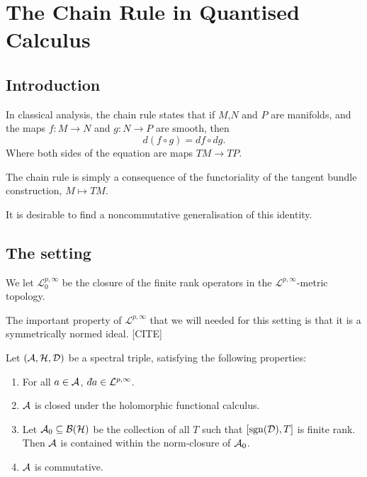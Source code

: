 
\chapter{The Chain Rule in Quantised Calculus} %

\label{TheChainRule} %



\section{Introduction}
In classical analysis, the chain rule states that if $M$,$N$ and $P$ are manifolds, 
 and the maps $f:M\rightarrow N$ and $g:N\rightarrow P$ are smooth, then
\begin{equation*}
    d(f\circ g) = df \circ dg.
\end{equation*}
Where both sides of the equation are maps $TM\rightarrow TP$.

\begin{remark}
    The chain rule is simply a consequence of the functoriality of the tangent
    bundle construction, $M\mapsto TM$.
\end{remark}

 It is desirable
to find a noncommutative generalisation of this identity.


\section{The setting}
We let $\mathcal{L}^{p,\infty}_0$ be the closure of the finite rank
operators in the $\mathcal{L}^{p,\infty}$-metric topology.

The important property of $\mathcal{L}^{p,\infty}$ that we will needed
for this setting is that it is a symmetrically normed ideal. [CITE]

Let $(\mathcal{A},\mathcal{H},\mathcal{D})$ be a spectral triple, satisfying the following properties:
\begin{enumerate}
    \item{} For all $a \in \mathcal{A}$, $\qd a \in \mathcal{L}^{p,\infty}$.
    \item{} $\mathcal{A}$ is closed under the holomorphic functional calculus.
    \item{} Let $\mathcal{A}_0 \subseteq \mathcal{B}(\mathcal{H})$ be the collection of all
    $T$ such that $[\operatorname{sgn}(\mathcal{D}),T]$ is finite rank. Then $\mathcal{A}$ is contained
    within the norm-closure of $\mathcal{A}_0$.
    \item{} $\mathcal{A}$ is commutative.
\end{enumerate}

